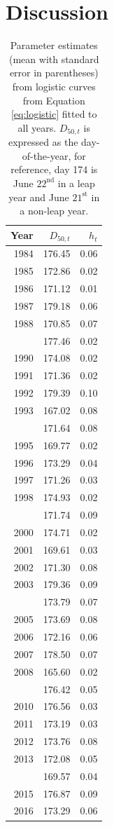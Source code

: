 \documentclass[12pt,]{book}
\theoremstyle{definition}
\theoremstyle{definition}
\theoremstyle{definition}
\theoremstyle{remark}
\begin{document}
\section{Discussion}\label{discussion}

\begin{singlespace}

\begin{table}

\caption{\label{tab:rt-ests-table}Parameter estimates (mean with standard error in parentheses) from logistic curves from Equation \ref{eq:logistic} fitted to all years. $D_{50,t}$ is expressed as the day-of-the-year, for reference, day 174 is June $22^{\text{nd}}$ in a leap year and June $21^{\text{st}}$ in a non-leap year.}
\centering
\begin{tabular}[t]{rrr}
\toprule
Year & $D_{50,t}$ & $h_t$\\
\midrule
1984 & 176.45 & 0.06\\
1985 & 172.86 & 0.02\\
1986 & 171.12 & 0.01\\
1987 & 179.18 & 0.06\\
1988 & 170.85 & 0.07\\
\addlinespace
1989 & 177.46 & 0.02\\
1990 & 174.08 & 0.02\\
1991 & 171.36 & 0.02\\
1992 & 179.39 & 0.10\\
1993 & 167.02 & 0.08\\
\addlinespace
1994 & 171.64 & 0.08\\
1995 & 169.77 & 0.02\\
1996 & 173.29 & 0.04\\
1997 & 171.26 & 0.03\\
1998 & 174.93 & 0.02\\
\addlinespace
1999 & 171.74 & 0.09\\
2000 & 174.71 & 0.02\\
2001 & 169.61 & 0.03\\
2002 & 171.30 & 0.08\\
2003 & 179.36 & 0.09\\
\addlinespace
2004 & 173.79 & 0.07\\
2005 & 173.69 & 0.08\\
2006 & 172.16 & 0.06\\
2007 & 178.50 & 0.07\\
2008 & 165.60 & 0.02\\
\addlinespace
2009 & 176.42 & 0.05\\
2010 & 176.56 & 0.03\\
2011 & 173.19 & 0.03\\
2012 & 173.76 & 0.08\\
2013 & 172.08 & 0.05\\
\addlinespace
2014 & 169.57 & 0.04\\
2015 & 176.87 & 0.09\\
2016 & 173.29 & 0.06\\
\bottomrule
\end{tabular}
\end{table}

\end{singlespace}
\end{document}
